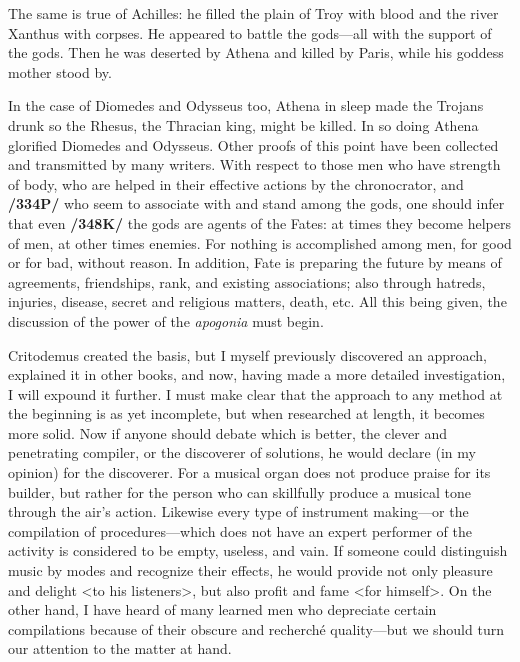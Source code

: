 The same is true of Achilles: he filled the plain of Troy with blood and the river Xanthus with corpses. He appeared to battle the gods—all with the support of the gods. Then he was deserted by Athena and killed by Paris, while his goddess mother stood by. 

In the case of Diomedes and Odysseus too, Athena in sleep made the Trojans drunk so the Rhesus, the Thracian king, might be killed. In so doing Athena glorified Diomedes and Odysseus. Other proofs of this point have been collected and transmitted by many writers. With respect to those men who have strength of body, who are helped in their effective actions by the chronocrator, and \textbf{/334P/} who seem to associate with and stand among the gods, one should infer that even \textbf{/348K/} the gods are agents of the Fates: at times they become helpers of men, at other times enemies. For nothing is accomplished among men, for good or for bad, without reason. In addition, Fate is preparing the future by means of agreements, friendships, rank, and existing associations; also through hatreds, injuries, disease, secret and religious matters, death, etc. All this being given, the discussion of the power of the \textit{apogonia} must begin. 

Critodemus created the basis, but I myself previously discovered an approach, explained it in other books, and now, having made a more detailed investigation, I will expound it further. I must make clear that the approach to any method at the beginning is as yet incomplete, but when researched at length, it becomes more solid. Now if anyone should debate which is better, the clever and penetrating compiler, or the discoverer of solutions, he would declare (in my opinion) for the discoverer. For a musical organ does not produce praise for its builder, but rather for the person who can skillfully produce a musical tone through the air’s action. Likewise every type of instrument making—or the compilation of procedures—which does not have an expert performer of the activity is considered to be empty, useless, and vain. If someone could distinguish music by modes and recognize their effects, he would provide not only pleasure and delight <to his listeners>, but also profit and fame <for himself>. On the other hand, I have heard of many learned men who depreciate certain compilations because of their obscure and recherché quality—but we should turn our attention to the matter at hand.

